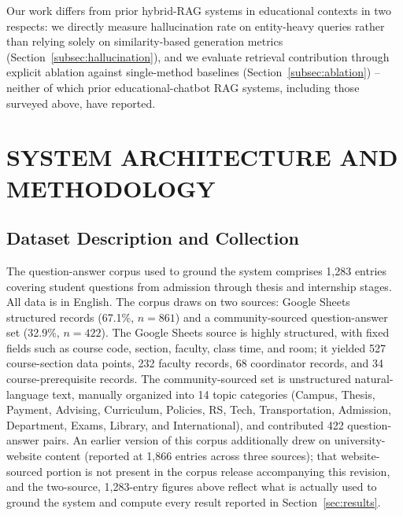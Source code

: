 \documentclass[a4paper,twoside]{article}
\begin{document}
Our work differs from prior hybrid-RAG systems in educational contexts in two respects: we directly measure hallucination rate on entity-heavy queries rather than relying solely on similarity-based generation metrics (Section~\ref{subsec:hallucination}), and we evaluate retrieval contribution through explicit ablation against single-method baselines (Section~\ref{subsec:ablation}) -- neither of which prior educational-chatbot RAG systems, including those surveyed above, have reported.

\section{\uppercase{System Architecture and Methodology}}
\label{sec:methodology}

\subsection{Dataset Description and Collection}
\label{subsec:dataset}

The question-answer corpus used to ground the system comprises 1,283 entries covering student questions from admission through thesis and internship stages. All data is in English. The corpus draws on two sources: Google Sheets structured records (67.1\%, $n=861$) and a community-sourced question-answer set (32.9\%, $n=422$). The Google Sheets source is highly structured, with fixed fields such as course code, section, faculty, class time, and room; it yielded 527 course-section data points, 232 faculty records, 68 coordinator records, and 34 course-prerequisite records. The community-sourced set is unstructured natural-language text, manually organized into 14 topic categories (Campus, Thesis, Payment, Advising, Curriculum, Policies, RS, Tech, Transportation, Admission, Department, Exams, Library, and International), and contributed 422 question-answer pairs. An earlier version of this corpus additionally drew on university-website content (reported at 1,866 entries across three sources); that website-sourced portion is not present in the corpus release accompanying this revision, and the two-source, 1,283-entry figures above reflect what is actually used to ground the system and compute every result reported in Section~\ref{sec:results}.
\end{document}
